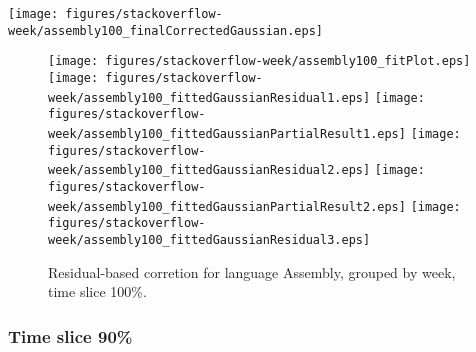 \begin{center}
{\texttt{[image: figures/stackoverflow-week/assembly100\_finalCorrectedGaussian.eps]}}
\end{center}

\FloatBarrier

\begin{figure}[t]
\centering
{}
{\texttt{[image: figures/stackoverflow-week/assembly100\_fitPlot.eps]}}
{\texttt{[image: figures/stackoverflow-week/assembly100\_fittedGaussianResidual1.eps]}}
{\texttt{[image: figures/stackoverflow-week/assembly100\_fittedGaussianPartialResult1.eps]}}
{\texttt{[image: figures/stackoverflow-week/assembly100\_fittedGaussianResidual2.eps]}}
{\texttt{[image: figures/stackoverflow-week/assembly100\_fittedGaussianPartialResult2.eps]}}
{\texttt{[image: figures/stackoverflow-week/assembly100\_fittedGaussianResidual3.eps]}}
\caption{Residual-based corretion for language Assembly, grouped by week, time slice 100\%.}
\end{figure}


\FloatBarrier


\subsubsection{Time slice 90\%}

